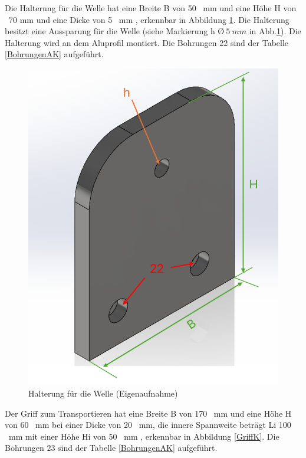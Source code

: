 Die Halterung für die Welle hat eine Breite B von 50 \ mm und eine Höhe H von \ 70 mm und eine Dicke von 5 \ mm , erkennbar in Abbildung \ref{FlankeK}. Die Halterung besitzt eine Aussparung für die Welle (siehe Markierung h \O $ \ 5 \ mm$ in Abb.\ref{FlankeK}). Die Halterung wird an dem Aluprofil montiert. Die Bohrungen 22 sind der Tabelle \ref{BohrungenAK} aufgeführt.  
 
\begin{figure}[H]
	\begin{center}
		\includegraphics[width=\textwidth]{Images/Konstruktion/FlankeK.png}
		\caption{Halterung für die Welle (Eigenaufnahme)} \label{FlankeK}
	\end{center}
\end{figure} 
 
Der Griff zum Transportieren hat eine Breite B von 170 \ mm und eine Höhe H von 60 \ mm bei einer Dicke von 20 \ mm, die innere Spannweite beträgt Li 100 \ mm mit einer Höhe Hi von  50 \ mm , erkennbar in Abbildung \ref{GriffK}. Die Bohrungen 23 sind der Tabelle \ref{BohrungenAK} aufgeführt.  

